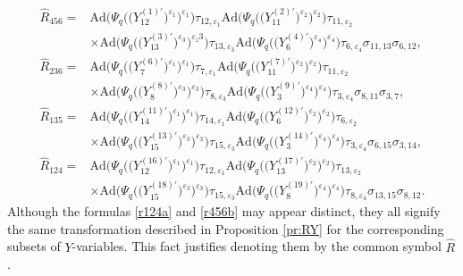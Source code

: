 \begin{align}
\widehat{R}_{456} ={}&
\mathrm{Ad}\bigl(\Psi_q\bigl(\bigl(Y^{(1)\prime}_{12}\bigr)^{\varepsilon_1}\bigr)^{\varepsilon_1}\bigr)\tau_{12,\varepsilon_1}
\mathrm{Ad}\bigl(\Psi_q\bigl(\bigl(Y^{(2)\prime}_{11}\bigr)^{\varepsilon_2}\bigr)^{\varepsilon_2}\bigr)\tau_{11,\varepsilon_2}\nonumber
\\
& \times
\mathrm{Ad}\bigl(\Psi_q\bigl(\bigl(Y^{(3)\prime}_{13}\bigr)^{\varepsilon_3}\bigr)^{\varepsilon_z3}\bigr)\tau_{13,\varepsilon_3}
\mathrm{Ad}\bigl(\Psi_q\bigl(\bigl(Y^{(4)\prime}_{6}\bigr)^{\varepsilon_4}\bigr)^{\varepsilon_4}\bigr)\tau_{6,\varepsilon_4}
\sigma_{11,13}\sigma_{6,12},\nonumber
\\
\widehat{R}_{236} ={}&
\mathrm{Ad}\bigl(\Psi_q\bigl(\bigl(Y^{(6)\prime}_{7}\bigr)^{\varepsilon_1}\bigr)^{\varepsilon_1}\bigr)\tau_{7,\varepsilon_1}
\mathrm{Ad}\bigl(\Psi_q\bigl(\bigl(Y^{(7)\prime}_{11}\bigr)^{\varepsilon_2}\bigr)^{\varepsilon_2}\bigr)\tau_{11,\varepsilon_2}\nonumber
\\
& \times
\mathrm{Ad}\bigl(\Psi_q\bigl(\bigl(Y^{(8)\prime}_{8}\bigr)^{\varepsilon_3}\bigr)^{\varepsilon_3}\bigr)\tau_{8,\varepsilon_3}
\mathrm{Ad}\bigl(\Psi_q\bigl(\bigl(Y^{(9)\prime}_{3}\bigr)^{\varepsilon_4}\bigr)^{\varepsilon_4}\bigr)\tau_{3,\varepsilon_4}
\sigma_{8,11}\sigma_{3,7},\nonumber
\\
\widehat{R}_{135} ={}&
\mathrm{Ad}\bigl(\Psi_q\bigl(\bigl(Y^{(11)\prime}_{14}\bigr)^{\varepsilon_1}\bigr)^{\varepsilon_1}\bigr)\tau_{14,\varepsilon_1}
\mathrm{Ad}\bigl(\Psi_q\bigl(\bigl(Y^{(12)\prime}_{6}\bigr)^{\varepsilon_2}\bigr)^{\varepsilon_2}\bigr)\tau_{6,\varepsilon_2}\nonumber
\\
& \times
\mathrm{Ad}\bigl(\Psi_q\bigl(\bigl(Y^{(13)\prime}_{15}\bigr)^{\varepsilon_3}\bigr)^{\varepsilon_3}\bigr)\tau_{15,\varepsilon_3}
\mathrm{Ad}\bigl(\Psi_q\bigl(\bigl(Y^{(14)\prime}_{3}\bigr)^{\varepsilon_4}\bigr)^{\varepsilon_4}\bigr)\tau_{3,\varepsilon_4}
\sigma_{6,15}\sigma_{3,14},\nonumber
\\
\widehat{R}_{124} ={}&
\mathrm{Ad}\bigl(\Psi_q\bigl(\bigl(Y^{(16)\prime}_{12}\bigr)^{\varepsilon_1}\bigr)^{\varepsilon_1}\bigr)\tau_{12,\varepsilon_1}
\mathrm{Ad}\bigl(\Psi_q\bigl(\bigl(Y^{(17)\prime}_{13}\bigr)^{\varepsilon_2}\bigr)^{\varepsilon_2}\bigr)\tau_{13,\varepsilon_2}\nonumber
\\
& \times
\mathrm{Ad}\bigl(\Psi_q\bigl(\bigl(Y^{(18)\prime}_{15}\bigr)^{\varepsilon_3}\bigr)^{\varepsilon_3}\bigr)\tau_{15,\varepsilon_3}
\mathrm{Ad}\bigl(\Psi_q\bigl(\bigl(Y^{(19)\prime}_{8}\bigr)^{\varepsilon_4}\bigr)^{\varepsilon_4}\bigr)\tau_{8,\varepsilon_4}
\sigma_{13,15}\sigma_{8,12}.\label{r456b}
\end{align}
Although the formulas \eqref{r124a} and \eqref{r456b} may appear distinct,
they all signify the same transformation described in Proposition \ref{pr:RY}
for the corresponding subsets of $Y$-variables.
This fact justifies denoting them by the common symbol $\widehat{R}$.

